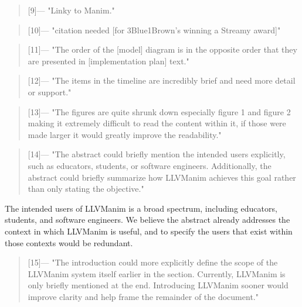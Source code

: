 \begin{quotation} [9]---%
  "Linky to Manim."
\end{quotation}

\begin{quotation} [10]---%
  "citation needed [for 3Blue1Brown's winning a Streamy award]"
\end{quotation}

\begin{quotation} [11]---%
  "The order of the [model] diagram is in the opposite order that they are presented in [implementation plan] text."
\end{quotation}

\begin{quotation} [12]---%
  "The items in the timeline are incredibly brief and need more detail or support."
\end{quotation}

\noindent\hrulefill

\begin{quotation} [13]---%
  "The figures are quite shrunk down especially figure 1 and figure 2 making it extremely difficult to read the content within it, if those were made larger it would greatly improve the readability."
\end{quotation}

\begin{quotation} [14]---%
  "The abstract could briefly mention the intended users explicitly, such as educators, students, or software engineers. Additionally, the abstract could briefly summarize how LLVManim achieves this goal rather than only stating the objective."
\end{quotation}
\noindent The intended users of LLVManim is a broad spectrum, including educators, students, and software engineers. We believe the abstract already addresses the context in which LLVManim is useful, and to specify the users that exist within those contexts would be redundant.

\begin{quotation} [15]---%
  "The introduction could more explicitly define the scope of the LLVManim system itself earlier in the section. Currently, LLVManim is only briefly mentioned at the end. Introducing LLVManim sooner would improve clarity and help frame the remainder of the document."
\end{quotation}

